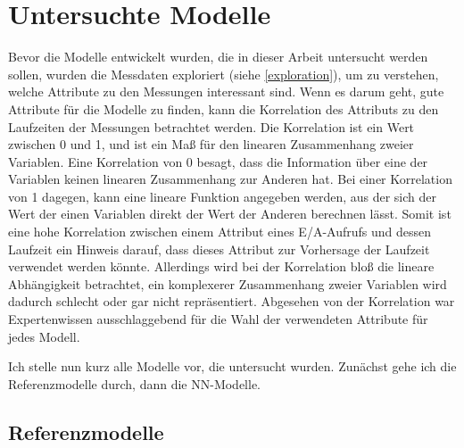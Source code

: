 \documentclass[
	12pt,
	a4paper,
	BCOR10mm,
	DIV14,
	listof=totoc,
	bibliography=totoc,
	headsepline
]{scrreprt}
\begin{document}
\section{Untersuchte Modelle}
\label{analyse:modelle}
Bevor die Modelle entwickelt wurden, die in dieser Arbeit untersucht werden sollen, wurden die Messdaten exploriert (siehe \ref{exploration}), um zu verstehen, welche Attribute zu den Messungen interessant sind.
Wenn es darum geht, gute Attribute für die Modelle zu finden, kann die Korrelation des Attributs zu den Laufzeiten der Messungen betrachtet werden.
Die Korrelation ist ein Wert zwischen 0 und 1, und ist ein Maß für den linearen Zusammenhang zweier Variablen. Eine Korrelation von 0 besagt, dass die Information über eine der Variablen keinen linearen Zusammenhang zur Anderen hat.
Bei einer Korrelation von 1 dagegen, kann eine lineare Funktion angegeben werden, aus der sich der Wert der einen Variablen direkt der Wert der Anderen berechnen lässt. Somit ist eine hohe Korrelation zwischen einem Attribut eines E/A-Aufrufs und dessen Laufzeit ein Hinweis darauf, dass dieses Attribut zur Vorhersage der Laufzeit verwendet werden könnte. 
Allerdings wird bei der Korrelation bloß die lineare Abhängigkeit betrachtet, ein komplexerer Zusammenhang zweier Variablen wird dadurch schlecht oder gar nicht repräsentiert.
Abgesehen von der Korrelation war Expertenwissen ausschlaggebend für die Wahl der verwendeten Attribute für jedes Modell.

Ich stelle nun kurz alle Modelle vor, die untersucht wurden. Zunächst gehe ich die Referenzmodelle durch, dann die NN-Modelle.

\subsection{Referenzmodelle}
\end{document}
